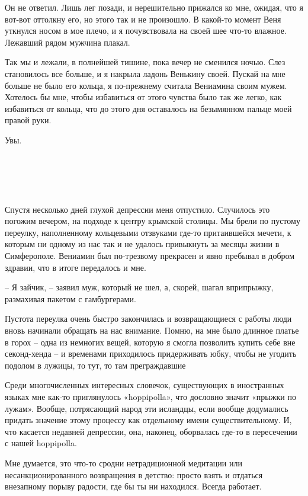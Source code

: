 \documentclass[
]{book}
\begin{document}
Он не ответил. Лишь лег позади, и нерешительно прижался ко мне, ожидая, что я вот-вот оттолкну его, но этого так и не произошло. В какой-то момент Веня уткнулся носом в мое плечо, и я почувствовала на своей шее что-то влажное. Лежавший рядом мужчина плакал.

Так мы и лежали, в полнейшей тишине, пока вечер не сменился ночью. Слез становилось все больше, и я накрыла ладонь Венькину своей. Пускай на мне больше не было его кольца, я по-прежнему считала Вениамина своим мужем. Хотелось бы мне, чтобы избавиться от этого чувства было так же легко, как избавиться от кольца, что до этого дня оставалось на безымянном пальце моей правой руки.

Увы.

\hypertarget{chapter-77}{%
\chapter{~}\label{chapter-77}}

Спустя несколько дней глухой депрессии меня отпустило. Случилось это погожим вечером, на подходе к центру крымской столицы. Мы брели по пустому переулку, наполненному кольцевыми отзвуками где-то притаившейся мечети, к которым ни одному из нас так и не удалось привыкнуть за месяцы жизни в Симферополе. Вениамин был по-трезвому прекрасен и явно пребывал в добром здравии, что в итоге передалось и мне.

-- Я зайчик, -- заявил муж, который не шел, а, скорей, шагал вприпрыжку, размахивая пакетом с гамбургерами.

Пустота переулка очень быстро закончилась и возвращающиеся с работы люди вновь начинали обращать на нас внимание. Помню, на мне было длинное платье в горох -- одна из немногих вещей, которую я смогла позволить купить себе вне секонд-хенда -- и временами приходилось придерживать юбку, чтобы не угодить подолом в лужицы, то тут, то там преграждавшие

Среди многочисленных интересных словечок, существующих в иностранных языках мне как-то приглянулось «hoppipolla», что дословно значит «прыжки по лужам». Вообще, потрясающий народ эти исландцы, если вообще додумались придать значение этому процессу как отдельному имени существительному. И, что касается недавней депрессии, она, наконец, оборвалась где-то в пересечении с нашей hoppipolla.

Мне думается, это что-то сродни нетрадиционной медитации или несанкционированного возвращения в детство: просто взять и отдаться внезапному порыву радости, где бы ты ни находился. Всегда работает.
\end{document}
